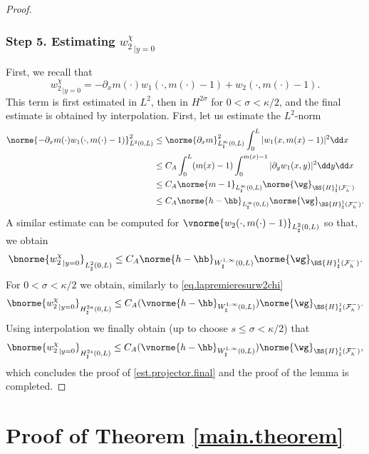 \begin{proof}
\subsubsection*{Step 5. Estimating ${w_{2}^\chi}_{|y=0}$}
First, we recall that
\[
{w_{2}^\chi}_{|{y=0}}=-\partial_x m(\cdot)w_{1}(\cdot,m(\cdot)-1)+w_{2}(\cdot,m(\cdot)-1).
\]
This term is first estimated in $L^2$, then in $H^{2\sigma}$ for $0<\sigma< \kappa/2$, and the final estimate is obtained by interpolation. First, let us estimate the $L^{2}$-norm
\[
\begin{aligned}
\norme{-\partial_x m(\cdot)w_{1}(\cdot,m(\cdot)-1)}_{L^{2}(0,L)}^{2}&{}\leq \norme{\partial_x m}_{L^{\infty}_{\sharp}(0,L)}^{2}\int_{0}^{L}\vert w_{1}(x,m(x)-1)\vert^{2}\dd x\\
&\leq C_{A}\int_{0}^{L}(m(x)-1)\int_{0}^{m(x)-1}\vert\partial_yw_{1}(x,y)\vert^{2}\dd y\dd x\\
&\leq C_{A}\norme{m-1}_{L^{\infty}_{\sharp}(0,L)}\norme{\wg}_{\BS{H}^{1}_{\sharp}(\mathcal{F}^{-}_{h})}\\
&\leq C_{A}\norme{h-\hb}_{L^{\infty}_{\sharp}(0,L)}\norme{\wg}_{\BS{H}^{1}_{\sharp}(\mathcal{F}^{-}_{h})}.
\end{aligned}\]
A similar estimate can be computed for $\vnorme{w_{2}(\cdot,m(\cdot)-1)}_{L^{2}_{\sharp}(0,L)}$ so that, we obtain
\[\bnorme{{w_{2}^\chi}_{|{y=0}}}_{{L}^{2}_{\sharp}(0,L)}\leq C_A\norme{h-\hb}_{W^{1,\infty}_{\sharp}(0,L)}\norme{\wg}_{\BS{H}^{1}_{\sharp}(\mathcal{F}^{-}_{h})}.\]
For $0<\sigma< \kappa/2$ we obtain, similarly to \eqref{eq.lapremieresurw2chi}
\[
\bnorme{{w_{2}^\chi}_{|{y=0}}}_{{H}^{2\sigma}_{\sharp}(0,L)} \leq C_A(\vnorme{h-\hb}_{W^{1,\infty}_{\sharp}(0,L)})\norme{\wg}_{\BS{H}^{1}_{\sharp}(\mathcal{F}^{-}_{h})}.\]
Using interpolation we finally obtain (up to choose $s \leq \sigma < \kappa/2$) that
\[\bnorme{{w_{2}^\chi}_{|{y=0}}}_{H^{2s}_{\sharp}(0,L)}\leq C_A(\vnorme{h-\hb}_{W^{1,\infty}_{\sharp}(0,L)})\norme{\wg}_{\BS{H}^{1}_{\sharp}(\mathcal{F}^{-}_{h})},\]
which concludes the proof of \eqref{est.projector.final} and the proof of the lemma is completed.
\end{proof}

\section{Proof of Theorem \ref{main.theorem}}

